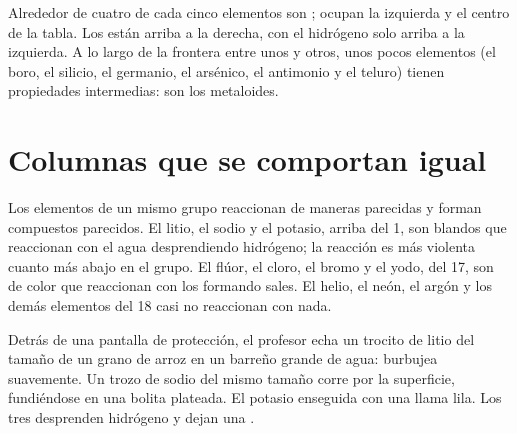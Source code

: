 \begin{proposition}\label{prop:g9:periodic-table-first-look:where}
Alrededor de cuatro de cada cinco elementos son ; ocupan la
izquierda y el centro de la tabla. Los  están arriba a la
derecha, con el hidrógeno solo arriba a la izquierda. A lo largo de la
frontera entre unos y otros, unos pocos elementos (el boro, el silicio,
el germanio, el arsénico, el antimonio y el teluro) tienen propiedades
intermedias: son los metaloides.
\end{proposition}

\section{Columnas que se comportan igual}

\begin{proposition}\label{prop:g9:periodic-table-first-look:alike}
Los elementos de un mismo grupo reaccionan de maneras parecidas y forman
compuestos parecidos. El litio, el sodio y el potasio, arriba del 
1, son  blandos que reaccionan con el agua desprendiendo
hidrógeno; la reacción es más violenta cuanto más abajo en el grupo. El
flúor, el cloro, el bromo y el yodo, del  17, son  de
color que reaccionan con los  formando sales. El helio, el neón,
el argón y los demás elementos del  18 casi no reaccionan con nada.
\end{proposition}

\begin{inthelab}
Detrás de una pantalla de protección, el profesor echa un trocito de
litio del tamaño de un grano de arroz en un barreño grande de agua:
burbujea suavemente. Un trozo de sodio del mismo tamaño corre por la
superficie, fundiéndose en una bolita plateada. El potasio  enseguida
con una llama lila. Los tres desprenden hidrógeno y dejan una .
\end{inthelab}

